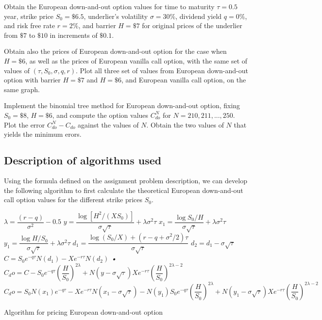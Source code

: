 Obtain the European down-and-out option values for time to maturity $\tau = 0.5$ year, strike price $S_0 = \$6.5$, underlier's volatility $\sigma = 30\%$, dividend yield $q = 0\%$, and risk free rate $r = 2\%$, and barrier $H = \$7$ for original prices of the underlier from $\$7$ to $\$10$ in increments of $\$0.1$. 

Obtain also the prices of European down-and-out option for the case when $H = \$6$, as well as the prices of European vanilla call option, with the same set of values of $(\tau, S_0, \sigma, q, r)$. Plot all three set of values from European down-and-out option with barrier $H = \$7$ and $H = \$6$, and European vanilla call option, on the same graph.

Implement the binomial tree method for European down-and-out option, fixing $S_0 = \$8$, $H = \$6$, and compute the option values $C_{do}^{N}$ for $N = 210, 211,...,250$. Plot the error $C^{N}_{do} - C_{do}$ against the values of $N$. Obtain the two values of $N$ that yields the minimum erors.

\subsection{Description of algorithms used}
Using the formula defined on the assignment problem description, we can develop the following algorithm to first calculate the theoretical European down-and-out call option values for the different strike prices $S_0$.

\begin{algorithm}[H]
 \label{theoretical-do}
 $\lambda = \dfrac{(r - q)}{\sigma ^ 2}- 0.5$\;
 $y = \dfrac{\log{[H ^ 2/(XS_0)]}}{\sigma\sqrt{\tau}} + \lambda\sigma^2\tau$\;
 $x_1 =\dfrac{\log{S_0/H}}{\sigma\sqrt{\tau}} + \lambda\sigma^2\tau$\;
 $y_1 =\dfrac{\log{H/S_0}}{\sigma\sqrt{\tau}} + \lambda\sigma^2\tau$\;
 $d_1 =\dfrac{\log{(S_0/X)} + (r-q+\sigma^2 / 2)\tau}{\sigma\sqrt{\tau}}$\;
 $d_2 = d_1 - \sigma\sqrt{\tau}$\;
 $C = S_0e^{-q\tau}N(d_1) - X e^{-r\tau}N(d_2)$\;
  {\textsl{•}
    $C_do = C - S_0e^{-q\tau}\left(\dfrac{H}{S_0}\right)^{2\lambda}
      + N(y-\sigma\sqrt{\tau})Xe^{-r\tau}\left(\dfrac{H}{S_0}\right)^{2\lambda-2}$\;
  }{$C_do = S_0N(x_1)e^{-q\tau}
      - Xe^{-r\tau}N(x_1-\sigma\sqrt{\tau})
      - N(y_1)S_0e^{-q\tau}\left(\dfrac{H}{S_0}\right)^{2\lambda} 
      + N(y_1-\sigma\sqrt{\tau})Xe^{-r\tau}\left(\dfrac{H}{S_0}\right)^{2\lambda-2}$\;
  }
\caption{Algorithm for pricing European down-and-out option}
\end{algorithm}

